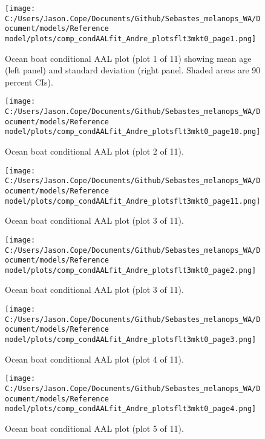 \documentclass[11pt,
  english,
  letterpaper,
]{article}
\begin{document}
\begin{figure}
\centering
\texttt{[image: C:/Users/Jason.Cope/Documents/Github/Sebastes\_melanops\_WA/Document/models/Reference model/plots/comp\_condAALfit\_Andre\_plotsflt3mkt0\_page1.png]}
\caption{Ocean boat conditional AAL plot (plot 1 of 11) showing mean age (left panel) and standard deviation (right panel. Shaded areas are 90 percent CIs).\label{fig:comp_condAALfit_Andre_plotsflt3mkt0_page1}}
\end{figure}

\begin{figure}
\centering
\texttt{[image: C:/Users/Jason.Cope/Documents/Github/Sebastes\_melanops\_WA/Document/models/Reference model/plots/comp\_condAALfit\_Andre\_plotsflt3mkt0\_page10.png]}
\caption{Ocean boat conditional AAL plot (plot 2 of 11).\label{fig:comp_condAALfit_Andre_plotsflt3mkt0_page10}}
\end{figure}

\begin{figure}
\centering
\texttt{[image: C:/Users/Jason.Cope/Documents/Github/Sebastes\_melanops\_WA/Document/models/Reference model/plots/comp\_condAALfit\_Andre\_plotsflt3mkt0\_page11.png]}
\caption{Ocean boat conditional AAL plot (plot 3 of 11).\label{fig:comp_condAALfit_Andre_plotsflt3mkt0_page11}}
\end{figure}

\begin{figure}
\centering
\texttt{[image: C:/Users/Jason.Cope/Documents/Github/Sebastes\_melanops\_WA/Document/models/Reference model/plots/comp\_condAALfit\_Andre\_plotsflt3mkt0\_page2.png]}
\caption{Ocean boat conditional AAL plot (plot 3 of 11).\label{fig:comp_condAALfit_Andre_plotsflt3mkt0_page2}}
\end{figure}

\begin{figure}
\centering
\texttt{[image: C:/Users/Jason.Cope/Documents/Github/Sebastes\_melanops\_WA/Document/models/Reference model/plots/comp\_condAALfit\_Andre\_plotsflt3mkt0\_page3.png]}
\caption{Ocean boat conditional AAL plot (plot 4 of 11).\label{fig:comp_condAALfit_Andre_plotsflt3mkt0_page3}}
\end{figure}

\begin{figure}
\centering
\texttt{[image: C:/Users/Jason.Cope/Documents/Github/Sebastes\_melanops\_WA/Document/models/Reference model/plots/comp\_condAALfit\_Andre\_plotsflt3mkt0\_page4.png]}
\caption{Ocean boat conditional AAL plot (plot 5 of 11).\label{fig:comp_condAALfit_Andre_plotsflt3mkt0_page4}}
\end{figure}
\end{document}
